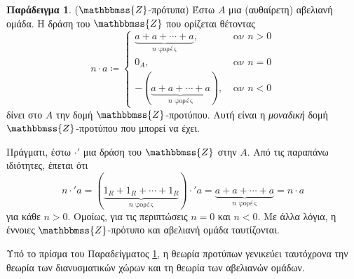\documentclass[12pt,a4paper,reqno]{amsart}
\theoremstyle{definition}
\newtheorem{example}[theorem]{Παράδειγμα}
\theoremstyle{remark}
\numberwithin{theorem}{section}
\numberwithin{exercise}{section}
\numberwithin{equation}{section}
\newcommand{\ZZ}{\mathbbmss{Z}}
\begin{document}
\begin{example}{\rm($\ZZ$-πρότυπα)}
    \label{ex:Z-modules}
    Έστω $A$ μια (αυθαίρετη) αβελιανή ομάδα. Η δράση του $\ZZ$ που ορίζεται θέτοντας 
    \[ 
        n\cdot a \coloneqq \begin{cases}
                \underbrace{a+a+\cdots+a}_{\text{$n$ φορές}}, &\ \text{αν $n > 0$} \\ 
                0_A, &\ \text{αν $n=0$} \\
                -(
                    \underbrace{a+a+\cdots+a}_{\text{$n$ φορές}}
                ), &\ \text{αν $n < 0$}
             \end{cases}         
    \]
    δίνει στο $A$ την δομή $\ZZ$-προτύπου. Αυτή είναι η \emph{μοναδική} δομή $\ZZ$-προτύπου που μπορεί να έχει.

    Πράγματι, έστω $\cdot'$ μια δράση του $\ZZ$ στην $A$. Από τις παραπάνω ιδιότητες, έπεται ότι 
    \[
    n\cdot'{a} = (\underbrace{1_R + 1_R + \cdots + 1_R}_{\text{$n$ φορές}})\cdot'{a} = \underbrace{a+a+\cdots+a}_{\text{$n$ φορές}} = n\cdot a
    \]
    για κάθε $n > 0$. Ομοίως, για τις περιπτώσεις $n=0$ και $n<0$. Με άλλα λόγια, η έννοιες $\ZZ$-πρότυπο και αβελιανή ομάδα ταυτίζονται.
\end{example}

Υπό το πρίσμα του Παραδείγματος \ref{ex:Z-modules}, η θεωρία προτύπων γενικεύει ταυτόχρονα την θεωρία των διανυσματικών χώρων και τη θεωρία των αβελιανών ομάδων. 
\end{document}
